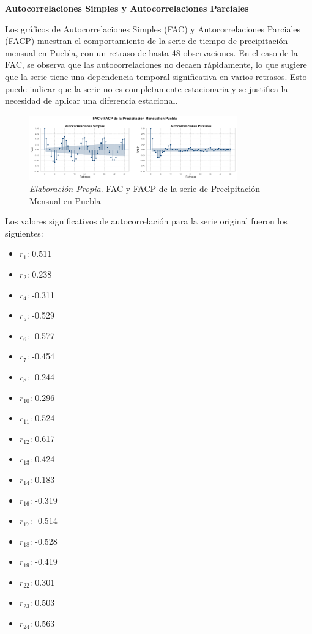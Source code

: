 \documentclass[12pt,letterpaper]{article}   %
\begin{document}
\textbf{Autocorrelaciones Simples y Autocorrelaciones Parciales
}

Los gráficos de Autocorrelaciones Simples (FAC) y Autocorrelaciones Parciales (FACP) muestran el comportamiento de la serie de tiempo de precipitación mensual en Puebla, con un retraso de hasta 48 observaciones. En el caso de la FAC, se observa que las autocorrelaciones no decaen rápidamente, lo que sugiere que la serie tiene una dependencia temporal significativa en varios retrasos. Esto puede indicar que la serie no es completamente estacionaria y se justifica la necesidad de aplicar una diferencia estacional.

\begin{figure}[ht]
    \centering
    \includegraphics[width=0.8\textwidth]{imagenes/02-01-fac-facp-serie.pdf}
    \caption{\textit{Elaboración Propia}. FAC y FACP de la serie de Precipitación Mensual en Puebla}
\end{figure}

Los valores significativos de autocorrelación para la serie original fueron los siguientes:
\begin{multicols}{5}
\scriptsize
\begin{itemize}
    \item $r_1$: 0.511
    \item $r_2$: 0.238
    \item $r_4$: -0.311
    \item $r_5$: -0.529
    \item $r_6$: -0.577
    \item $r_7$: -0.454
    \item $r_8$: -0.244
    \item $r_{10}$: 0.296
    \item $r_{11}$: 0.524
    \item $r_{12}$: 0.617
    \item $r_{13}$: 0.424
    \item $r_{14}$: 0.183
    \item $r_{16}$: -0.319
    \item $r_{17}$: -0.514
    \item $r_{18}$: -0.528
    \item $r_{19}$: -0.419
    \item $r_{22}$: 0.301
    \item $r_{23}$: 0.503
    \item $r_{24}$: 0.563
\end{itemize}
\end{multicols}{}
\end{document}
